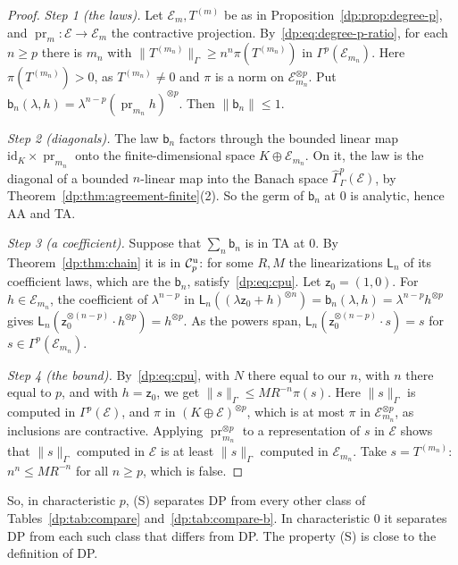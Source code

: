 \documentclass[11pt]{amsart}
\theoremstyle{definition}
\theoremstyle{remark}
\numberwithin{equation}{section}
\newcommand{\id}{\mathrm{id}}
\newcommand{\norm}[1]{\lVert #1\rVert}
\newcommand{\cC}{\mathcal{C}}
\theoremstyle{plain}
\theoremstyle{definition}
\theoremstyle{plain}
\newcommand{\hGamma}{\widehat\Gamma}
\begin{document}
\begin{proof}
\emph{Step 1 (the laws).} Let $\mathcal E_m,T^{(m)}$ be as in Proposition~\ref{dp:prop:degree-p}, and $\operatorname{pr}_m\colon\mathcal E\to\mathcal E_m$ the contractive projection. By~\eqref{dp:eq:degree-p-ratio}, for each $n\ge p$ there is $m_n$ with $\norm{T^{(m_n)}}_\Gamma\ge n^n\pi(T^{(m_n)})$ in $\Gamma^p(\mathcal E_{m_n})$. Here $\pi(T^{(m_n)})>0$, as $T^{(m_n)}\ne0$ and $\pi$ is a norm on $\mathcal E_{m_n}^{\otimes p}$. Put $\mathsf b_n(\lambda,h)=\lambda^{n-p}(\operatorname{pr}_{m_n}h)^{\otimes p}$. Then $\norm{\mathsf b_n}\le1$.

\emph{Step 2 (diagonals).} The law $\mathsf b_n$ factors through the bounded linear map $\id_K\times\operatorname{pr}_{m_n}$ onto the finite-dimensional space $K\oplus\mathcal E_{m_n}$. On it, the law is the diagonal of a bounded $n$\nobreakdash-linear map into the Banach space $\hGamma^p_\Gamma(\mathcal E)$, by Theorem~\ref{dp:thm:agreement-finite}(2). So the germ of $\mathsf b_n$ at $0$ is analytic, hence AA and TA.

\emph{Step 3 (a coefficient).} Suppose that $\sum_n\mathsf b_n$ is in TA at $0$. By Theorem~\ref{dp:thm:chain} it is in $\cC_p^{\rm u}$: for some $R,M$ the linearizations $\mathsf L_n$ of its coefficient laws, which are the $\mathsf b_n$, satisfy~\eqref{dp:eq:cpu}. Let $\mathsf z_0=(1,0)$. For $h\in\mathcal E_{m_n}$, the coefficient of $\lambda^{n-p}$ in $\mathsf L_n((\lambda\mathsf z_0+h)^{\otimes n})=\mathsf b_n(\lambda,h)=\lambda^{n-p}h^{\otimes p}$ gives $\mathsf L_n(\mathsf z_0^{\otimes(n-p)}\cdot h^{\otimes p})=h^{\otimes p}$. As the powers span, $\mathsf L_n(\mathsf z_0^{\otimes(n-p)}\cdot s)=s$ for $s\in\Gamma^p(\mathcal E_{m_n})$.

\emph{Step 4 (the bound).} By~\eqref{dp:eq:cpu}, with $N$ there equal to our $n$, with $n$ there equal to $p$, and with $h=\mathsf z_0$, we get $\norm s_\Gamma\le MR^{-n}\pi(s)$. Here $\norm s_\Gamma$ is computed in $\Gamma^p(\mathcal E)$, and $\pi$ in $(K\oplus\mathcal E)^{\otimes p}$, which is at most $\pi$ in $\mathcal E_{m_n}^{\otimes p}$, as inclusions are contractive. Applying $\operatorname{pr}_{m_n}^{\otimes p}$ to a representation of $s$ in $\mathcal E$ shows that $\norm s_\Gamma$ computed in $\mathcal E$ is at least $\norm s_\Gamma$ computed in $\mathcal E_{m_n}$. Take $s=T^{(m_n)}$: $n^n\le MR^{-n}$ for all $n\ge p$, which is false.
\end{proof}

So, in characteristic $p$, (S) separates DP from every other class of Tables~\ref{dp:tab:compare} and~\ref{dp:tab:compare-b}. In characteristic $0$ it separates DP from each such class that differs from DP. The property (S) is close to the definition of DP.
\end{document}
